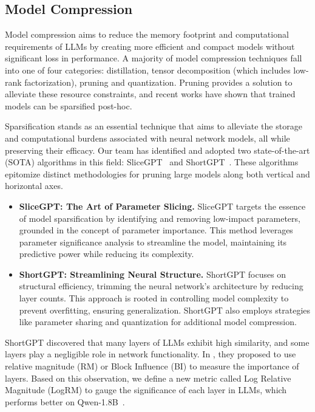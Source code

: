 \documentclass[conference]{IEEEtran}
\begin{document}

\subsection{Model Compression}\label{AA}
Model compression aims to reduce the memory footprint and computational requirements of LLMs by creating more efficient and compact models without significant loss in performance.  A majority of model compression techniques fall into one of four categories: distillation, tensor decomposition (which includes low-rank factorization), pruning and quantization. Pruning provides a solution to alleviate these resource constraints, and recent works have shown that trained models can be sparsified post-hoc.

Sparsification stands as an essential technique that aims to alleviate the storage and computational burdens associated with neural network models, all while preserving their efficacy. Our team has identified and adopted two state-of-the-art (SOTA) algorithms in this field: SliceGPT~\cite{slicegpt_ashkboos2024slicegpt} and ShortGPT~\cite{shortgpt_Men_Xu_Zhang_Wang_Lin_Lu_Han_Chen}. These algorithms epitomize distinct methodologies for pruning large models along both vertical and horizontal axes.

\begin{itemize}
    \item \textbf{SliceGPT: The Art of Parameter Slicing.} SliceGPT targets the essence of model sparsification by identifying and removing low-impact parameters, grounded in the concept of parameter importance. This method leverages parameter significance analysis to streamline the model, maintaining its predictive power while reducing its complexity.
    \item \textbf{ShortGPT: Streamlining Neural Structure.} ShortGPT focuses on structural efficiency, trimming the neural network's architecture by reducing layer counts. This approach is rooted in controlling model complexity to prevent overfitting, ensuring generalization. ShortGPT also employs strategies like parameter sharing and quantization for additional model compression.
\end{itemize}

ShortGPT discovered that many layers of LLMs exhibit high similarity, and some layers play a negligible role in network functionality. In 
\cite{rm_Samragh_Farajtabar_Mehta_Vemulapalli_Faghri_Naik_Tuzel_Apple,shortgpt_Men_Xu_Zhang_Wang_Lin_Lu_Han_Chen}, they proposed to use relative magnitude (RM) or Block Influence (BI) to measure the importance of layers. Based on this observation, we define a new metric called Log Relative Magnitude (LogRM) to gauge the significance of each layer in LLMs, which performs better on Qwen-1.8B~\cite{qwen_1_8_bai2023qwen}.
\end{document}
